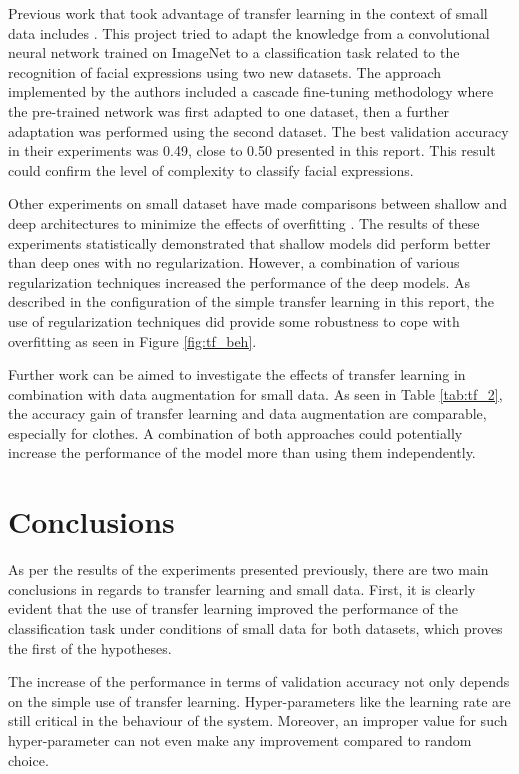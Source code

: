 \documentclass{article}
\begin{document}
Previous work that took advantage of transfer learning in the context of small data includes \citep{ng2015deep}. This project tried to adapt the knowledge from a convolutional neural network trained on ImageNet to a classification task related to the recognition of facial expressions using two new datasets. The approach implemented by the authors included a cascade fine-tuning methodology where the pre-trained network was first adapted to one dataset, then a further adaptation was performed using the second dataset. The best validation accuracy in their experiments was 0.49, close to 0.50 presented in this report. This result could confirm the level of complexity to classify facial expressions.

Other experiments on small dataset have made comparisons between shallow and deep architectures to minimize the effects of overfitting \citep{pasupa2016comparison}. The results of these experiments statistically demonstrated that shallow models did perform better than deep ones with no regularization. However, a combination of various regularization techniques increased the performance of the deep models. As described in the configuration of the simple transfer learning in this report, the use of regularization techniques did provide some robustness to cope with overfitting as seen in Figure \ref{fig:tf_beh}.

Further work can be aimed to investigate the effects of transfer learning in combination with data augmentation for small data. As seen in Table \ref{tab:tf_2}, the accuracy gain of transfer learning and data augmentation are comparable, especially for clothes. A combination of both approaches could potentially increase the performance of the model more than using them independently.

\section{Conclusions}
\label{sec:conclusions}

As per the results of the experiments presented previously, there are two main conclusions in regards to transfer learning and small data. First, it is clearly evident that the use of transfer learning improved the performance of the classification task under conditions of small data for both datasets, which proves the first of the hypotheses.

The increase of the performance in terms of validation accuracy not only depends on the simple use of transfer learning. Hyper-parameters like the learning rate are still critical in the behaviour of the system. Moreover, an improper value for such hyper-parameter can not even make any improvement compared to random choice. 
\end{document}
